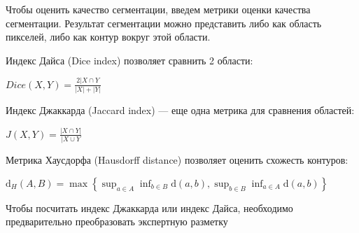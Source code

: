 Чтобы оценить качество сегментации, введем метрики оценки качества сегментации. Результат сегментации можно представить либо как область пикселей, либо как контур вокруг этой области. 

Индекс Дайса (Dice index) позволяет сравнить 2 области:

$Dice(X,Y) = \frac{2|X\cap{}Y}{|X| + |Y|}$

Индекс Джаккарда (Jaccard index) — еще одна метрика для сравнения областей:

$J(X,Y) = \frac{|X\cap{}Y|}{|X\cup{}Y}$

Метрика Хаусдорфа (Hausdorff distance) позволяет оценить схожесть контуров:

$\mathrm{d}_{H}(A,B)=\max\left\{\sup_{a\in{}A}\inf_{b\in{}B}\mathrm{d}(a,b),\sup_{b\in{}B}\inf_{a\in{}A}\mathrm{d}(a,b)\right\}$

Чтобы посчитать индекс Джаккарда или индекс Дайса, необходимо предварительно преобразовать экспертную разметку
